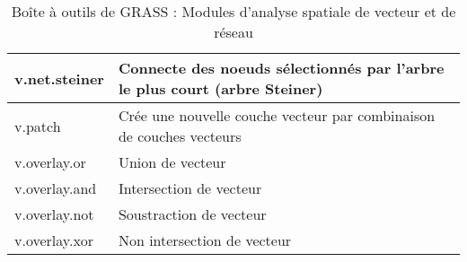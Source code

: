 \begin{table}[H]
\begin{tabular}{|p{4cm}|p{10cm}|}
  \hline v.net.steiner & Connecte des noeuds sélectionnés par l'arbre le plus court (arbre Steiner) \\
  \hline v.patch & Crée une nouvelle couche vecteur par combinaison de couches vecteurs\\
  \hline v.overlay.or & Union de vecteur\\
  \hline v.overlay.and & Intersection de vecteur\\
  \hline v.overlay.not & Soustraction de vecteur \\
  \hline v.overlay.xor & Non intersection de vecteur\\
\hline
\end{tabular}
\caption{Boîte à outils de GRASS : Modules d'analyse spatiale de vecteur et de réseau}
\end{table}

\vspace{-0.5cm}

